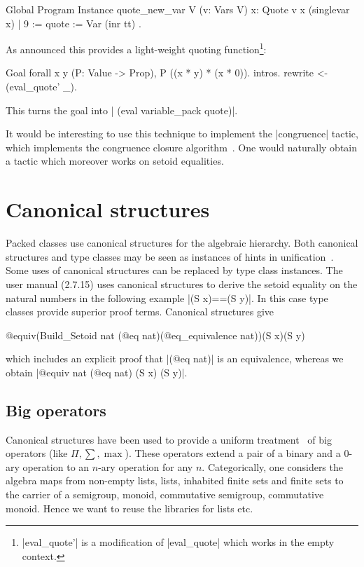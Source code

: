 \documentclass[a4paper,10pt, runningheads]{llncs}
\begin{document}
\begin{code}
Global Program Instance quote_new_var V (v: Vars V) x:
  Quote v x (singlevar x) | 9 := { quote := Var (inr tt) }.
\end{code}

\noindent As announced this provides a light-weight quoting function\footnote{|eval_quote'| is a
modification of |eval_quote| which works in the empty context.}:
\begin{code}
Goal forall x y (P: Value -> Prop), P ((x * y) * (x * 0)).
  intros. rewrite <- (eval_quote' _).
\end{code}
This turns the goal into | (eval variable_pack quote)|.

It would be interesting to use this technique to implement the |congruence| tactic, which implements
the congruence closure algorithm~\cite{corbineau2007deciding}. One would naturally obtain a tactic
which moreover works on setoid equalities.

\section{Canonical structures}\label{canonical}
Packed classes use canonical structures for the algebraic hierarchy. Both canonical structures and
type classes may be seen as instances of hints in unification~\cite{Hints}. Some uses of canonical
structures can be replaced by type class instances. The user manual (2.7.15) uses canonical
structures to derive the setoid equality on the natural
numbers in the following example |(S x)==(S y)|. In this case type classes provide superior proof
terms. Canonical structures give
\begin{code}
@equiv(Build_Setoid nat (@eq nat)(@eq_equivalence nat))(S x)(S y)
\end{code}
which includes an explicit proof that |(@eq nat)| is an equivalence,
whereas we obtain |@equiv nat (@eq nat) (S x) (S y)|.

\subsection{Big operators}
Canonical structures have been used to provide a uniform treatment~\cite{bertot2008canonical} of big
operators (like $\Pi,\sum, \max$). These operators extend a pair of a binary and a 0-ary operation
to an $n$-ary operation for any $n$. Categorically, one considers the algebra maps from non-empty
lists, lists, inhabited finite sets and finite sets to the carrier of a semigroup, monoid,
commutative semigroup, commutative monoid. Hence we want to reuse the libraries for lists etc.
\end{document}
